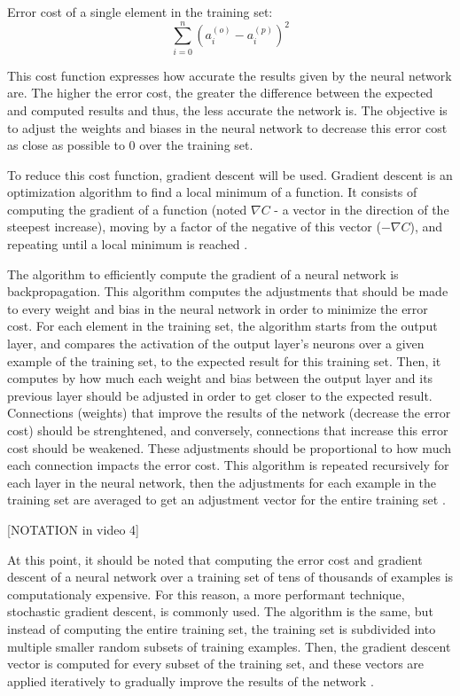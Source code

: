 \documentclass[12pt,a4paper,titlepage]{article}
\begin{document}
Error cost of a single element in the training set:
\begin{displaymath}
	\sum_{i=0}^{n} (a_{i}^{(o)} - a_{i}^{(p)})^{2}
\end{displaymath}

This cost function expresses how accurate the results given by the neural network are. The higher the error cost, the greater the difference between the expected and computed results and thus, the less accurate the network is. The objective is to adjust the weights and biases in the neural network to decrease this error cost as close as possible to 0 over the training set.

To reduce this cost function, gradient descent will be used. Gradient descent is an optimization algorithm to find a local minimum of a function. It consists of computing the gradient of a function (noted \(\nabla C\) - a vector in the direction of the steepest increase), moving by a factor of the negative of this vector (\(-\nabla C\)), and repeating until a local minimum is reached \cite{sanderson_gradient_2017}.

The algorithm to efficiently compute the gradient of a neural network is backpropagation. This algorithm computes the adjustments that should be made to every weight and bias in the neural network in order to minimize the error cost. For each element in the training set, the algorithm starts from the output layer, and compares the activation of the output layer's neurons over a given example of the training set, to the expected result for this training set. Then, it computes by how much each weight and bias between the output layer and its previous layer should be adjusted in order to get closer to the expected result. Connections (weights) that improve the results of the network (decrease the error cost) should be strenghtened, and conversely, connections that increase this error cost should be weakened. These adjustments should be proportional to how much each connection impacts the error cost. This algorithm is repeated recursively for each layer in the neural network, then the adjustments for each example in the training set are averaged to get an adjustment vector for the entire training set \cite{sanderson_gradient_2017}.

[NOTATION in video 4]

At this point, it should be noted that computing the error cost and gradient descent of a neural network over a training set of tens of thousands of examples is computationaly expensive. For this reason, a more performant technique, stochastic gradient descent, is commonly used. The algorithm is the same, but instead of computing the entire training set, the training set is subdivided into multiple smaller random subsets of training examples. Then, the gradient descent vector is computed for every subset of the training set, and these vectors are applied iteratively to gradually improve the results of the network \cite{sanderson_gradient_2017}.
\end{document}
